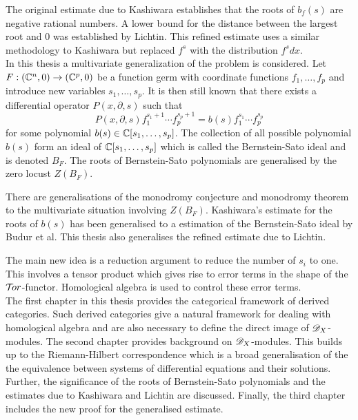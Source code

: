 The original estimate due to Kashiwara establishes that the roots of $b_f(s)$ are negative rational numbers.
A lower bound for the distance between the largest root and $0$ was established by Lichtin.
This refined estimate uses a similar methodology to Kashiwara but replaced $f^s$ with the distribution $f^s dx$.
\\

In this thesis a multivariate generalization of the problem is considered.
Let $F:(\mathbb{C}^{n},0)\to (\mathbb{C}^p,0)$ be a function germ with coordinate functions $f_1,\ldots, f_p$ and introduce new variables $s_1,\ldots, s_p$.
It is then still known that there exists a differential operator $P(x,\partial, s)$ such that
$$P(x,\partial,s) f_1^{s_1 + 1}\cdots f_p^{s_p + 1} = b(s)f_1^{s_1}\cdots f_p^{s_p}$$
for some polynomial $b(s) \in \mathbb{C}[s_1,\ldots, s_p]$.
The collection of all possible polynomial $b(s)$ form an ideal of $\mathbb{C}[s_1,\ldots,s_p]$ which is called the Bernstein-Sato ideal and is denoted $B_{F}$.
The roots of Bernstein-Sato polynomials are generalised by the zero locust $Z(B_F)$.

There are generalisations of the monodromy conjecture and monodromy theorem to the multivariate situation involving $Z(B_F)$.
Kashiwara's estimate for the roots of $b(s)$ has been generalised to a estimation of the Bernstein-Sato ideal by Budur et al.
This thesis also generalises the refined estimate due to Lichtin.

The main new idea is a reduction argument to reduce the number of $s_i$ to one.
This involves a tensor product which gives rise to error terms in the shape of the $\mathcal{T}\mkern -3mu or$-functor.
Homological algebra is used to control these error terms.
\\

The first chapter in this thesis provides the categorical framework of derived categories.
Such derived categories give a natural framework for dealing with homological algebra and are also necessary to define the direct image of $\mathscr{D}_X$-modules.
The second chapter provides background on $\mathscr{D}_X$-modules. This builds up to the Riemann-Hilbert correspondence which is a broad generalisation of the the equivalence between systems of differential equations and their solutions.
Further, the significance of the roots of Bernstein-Sato polynomials and the estimates due to Kashiwara and Lichtin are discussed.
Finally, the third chapter includes the new proof for the generalised estimate.
